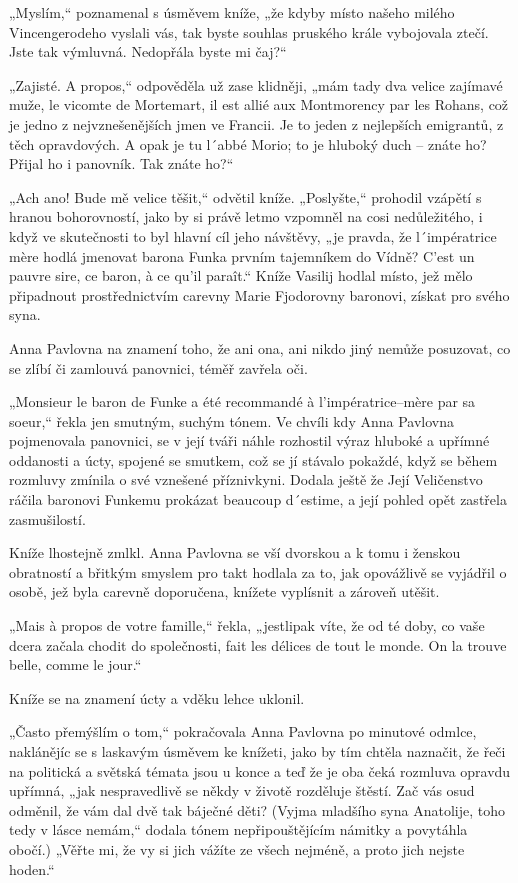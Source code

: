 „Myslím,“ poznamenal s úsměvem kníže, „že kdyby místo našeho milého Vincengerodeho vyslali vás, tak byste souhlas pruského krále vybojovala ztečí. Jste tak výmluvná. Nedopřála byste mi čaj?“

„Zajisté. A propos,“ odpověděla už zase klidněji, „mám tady dva velice zajímavé muže, le vicomte de Mortemart, il est allié aux Montmorency par les Rohans, což je jedno z nejvznešenějších jmen ve Francii. Je to jeden z nejlepších emigrantů, z těch opravdových. A opak je tu l´abbé Morio; to je hluboký duch – znáte ho? Přijal ho i panovník. Tak znáte ho?“

„Ach ano! Bude mě velice těšit,“ odvětil kníže. „Poslyšte,“ prohodil vzápětí s hranou bohorovností, jako by si právě letmo vzpomněl na cosi nedůležitého, i když ve skutečnosti to byl hlavní cíl jeho návštěvy, „je pravda, že l´impératrice mère hodlá jmenovat barona Funka prvním tajemníkem do Vídně? C'est un pauvre sire, ce baron, à ce qu'il paraît.“ Kníže Vasilij hodlal místo, jež mělo připadnout prostřednictvím carevny Marie Fjodorovny baronovi, získat pro svého syna.

Anna Pavlovna na znamení toho, že ani ona, ani nikdo jiný nemůže posuzovat, co se zlíbí či zamlouvá panovnici, téměř zavřela oči.

„Monsieur le baron de Funke a été recommandé à l'impératrice–mère par sa soeur,“ řekla jen smutným, suchým tónem. Ve chvíli kdy Anna Pavlovna pojmenovala panovnici, se v její tváři náhle rozhostil výraz hluboké a upřímné oddanosti a úcty, spojené se smutkem, což se jí stávalo pokaždé, když se během rozmluvy zmínila o své vznešené příznivkyni. Dodala ještě že Její Veličenstvo ráčila baronovi Funkemu prokázat beaucoup d´estime, a její pohled opět zastřela zasmušilostí.

Kníže lhostejně zmlkl. Anna Pavlovna se vší dvorskou a k tomu i ženskou obratností a břitkým smyslem pro takt hodlala za to, jak opovážlivě se vyjádřil o osobě, jež byla carevně doporučena, knížete vyplísnit a zároveň utěšit.

„Mais à propos de votre famille,“ řekla, „jestlipak víte, že od té doby, co vaše dcera začala chodit do společnosti, fait les délices de tout le monde. On la trouve belle, comme le jour.“

Kníže se na znamení úcty a vděku lehce uklonil.

„Často přemýšlím o tom,“ pokračovala Anna Pavlovna po minutové odmlce, naklánějíc se s laskavým úsměvem ke knížeti, jako by tím chtěla naznačit, že řeči na politická a světská témata jsou u konce a teď že je oba čeká rozmluva opravdu upřímná, „jak nespravedlivě se někdy v životě rozděluje štěstí. Zač vás osud odměnil, že vám dal dvě tak báječné děti? (Vyjma mladšího syna Anatolije, toho tedy v lásce nemám,“ dodala tónem nepřipouštějícím námitky a povytáhla obočí.) „Věřte mi, že vy si jich vážíte ze všech nejméně, a proto jich nejste hoden.“

